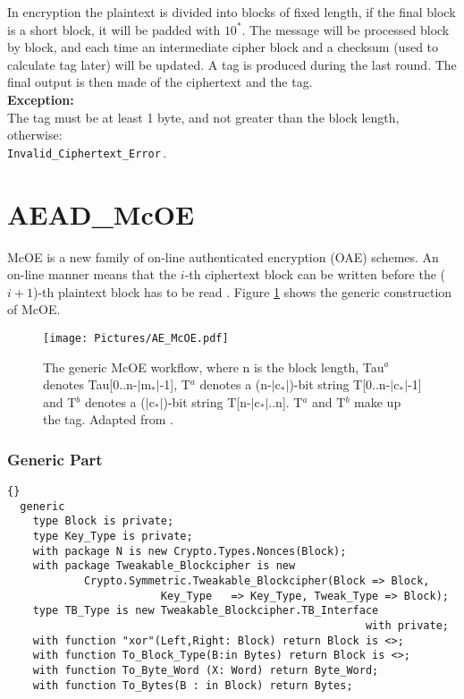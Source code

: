 In encryption the plaintext is divided into blocks of fixed length, if the final block is a short block, it will be padded with $10^*$. The message will be processed block by block, and each time an intermediate cipher block and a checksum (used to calculate tag later) will be updated. A tag is produced during the last round. The final output is then made of the ciphertext and the tag.\\
\textbf{Exception:}\\
The tag must be at least 1 byte, and not greater than the block length, otherwise:\\
\texttt{Invalid\_Ciphertext\_Error}\,.\\
\section{AEAD\_McOE}
McOE is a new family of on-line authenticated encryption (OAE) schemes. An on-line manner means that the $i$-th ciphertext block can be written before the ($i+1$)-th plaintext block has to be read \cite{DBLP:conf/fse/FleischmannFL12}. Figure \ref{Mc} shows the generic construction of McOE.
\begin{figure}[htp]
\centering
\texttt{[image: Pictures/AE\_McOE.pdf]} 
\caption{The generic McOE workflow, where n is the block length, Tau$^a$ denotes Tau[0..n-$|$m$_*|$-1], T$^a$ denotes a (n-$|$c$_*|$)-bit string T[0..n-$|$c$_*|$-1] and T$^b$ denotes a ($|$c$_*|$)-bit string T[n-$|$c$_*|$..n]. T$^a$ and T$^b$ make up the tag.
Adapted from \cite{DBLP:conf/fse/FleischmannFL12}.}\label{Mc}
\end{figure}
\newpage
\subsubsection*{Generic Part}
\begin{lstlisting}{}
  generic
    type Block is private;
    type Key_Type is private;
    with package N is new Crypto.Types.Nonces(Block);
    with package Tweakable_Blockcipher is new
    	 	Crypto.Symmetric.Tweakable_Blockcipher(Block => Block, 
     					Key_Type   => Key_Type, Tweak_Type => Block);
    type TB_Type is new Tweakable_Blockcipher.TB_Interface 
    													with private;
    with function "xor"(Left,Right: Block) return Block is <>;
    with function To_Block_Type(B:in Bytes) return Block is <>;
    with function To_Byte_Word (X: Word) return Byte_Word; 
    with function To_Bytes(B : in Block) return Bytes;
\end{lstlisting}

